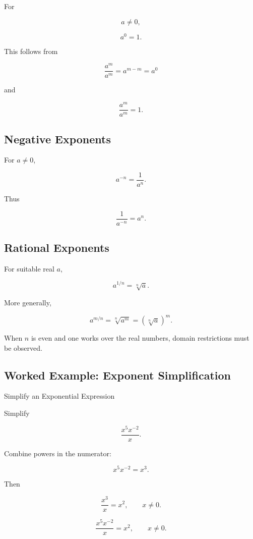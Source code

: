 For

\[
a\neq0,
\]

\[
\boxed{
a^0=1.
}
\]

This follows from

\[
\frac{a^m}{a^m}
=
a^{m-m}
=
a^0
\]

and

\[
\frac{a^m}{a^m}=1.
\]

\subsection{Negative Exponents}
\label{subsec:negative-exponents-reference}

For \(a\neq0\),

\[
\boxed{
a^{-n}
=
\frac{1}{a^n}.
}
\]

Thus

\[
\boxed{
\frac{1}{a^{-n}}
=
a^n.
}
\]

\subsection{Rational Exponents}
\label{subsec:rational-exponents-reference}

For suitable real \(a\),

\[
\boxed{
a^{1/n}
=
\sqrt[n]{a}.
}
\]

More generally,

\[
\boxed{
a^{m/n}
=
\sqrt[n]{a^m}
=
\left(
\sqrt[n]{a}
\right)^m.
}
\]

When \(n\) is even and one works over the real numbers, domain restrictions
must be observed.

\subsection{Worked Example: Exponent Simplification}
\label{subsec:worked-exponent-simplification}

\begin{workedexamplebox}{Simplify an Exponential Expression}

Simplify

\[
\frac{x^5x^{-2}}{x}.
\]

Combine powers in the numerator:

\[
x^5x^{-2}
=
x^3.
\]

Then

\[
\frac{x^3}{x}
=
x^2,
\qquad
x\neq0.
\]

\begin{answerbox}
\[
\boxed{
\frac{x^5x^{-2}}{x}
=
x^2,
\qquad
x\neq0.
}
\]
\end{answerbox}

\end{workedexamplebox}

